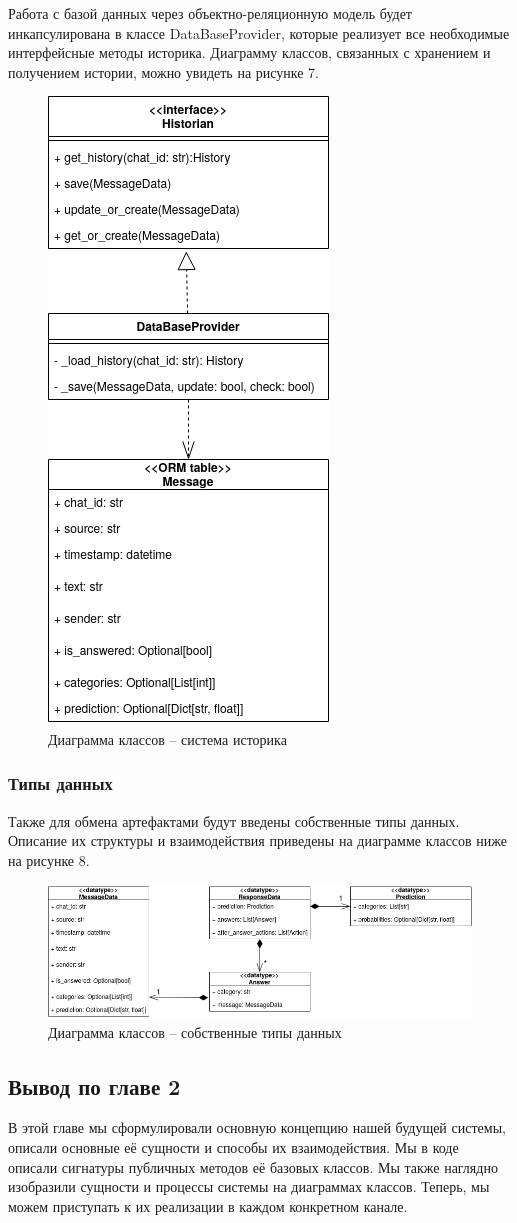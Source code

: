     Работа с базой данных через объектно-реляционную модель будет инкапсулирована
    в классе DataBaseProvider, которые реализует все необходимые интерфейсные
    методы историка. Диаграмму классов, связанных с хранением и получением
    истории, можно увидеть на рисунке 7.
    \begin{figure}[H]
        \centering

        \includegraphics[width=0.3\linewidth]{static/ClassDiagram_dbprovider.png}
        \caption{Диаграмма классов -- система историка}
        \label{fig:class-diagram-dbprovider}
    \end{figure}

    \subsubsection{Типы данных}
    Также для обмена артефактами будут введены собственные типы данных.
    Описание их структуры и взаимодействия приведены на диаграмме классов ниже
    на рисунке 8.
    \begin{figure}[H]
        \centering
        \includegraphics[width=\linewidth]{static/ClassDiagram_datatypes.png}
        \caption{Диаграмма классов -- собственные типы данных}
        \label{fig:class-diagram-datatypes}
    \end{figure}

    \subsection*{Вывод по главе 2}
    В этой главе мы сформулировали основную концепцию нашей будущей системы, 
    описали основные её сущности и способы их взаимодействия. Мы в коде описали 
    сигнатуры публичных методов её базовых классов.
    Мы также наглядно изобразили сущности и процессы системы на диаграммах классов.
    Теперь, мы можем приступать к их реализации в каждом конкретном канале.
